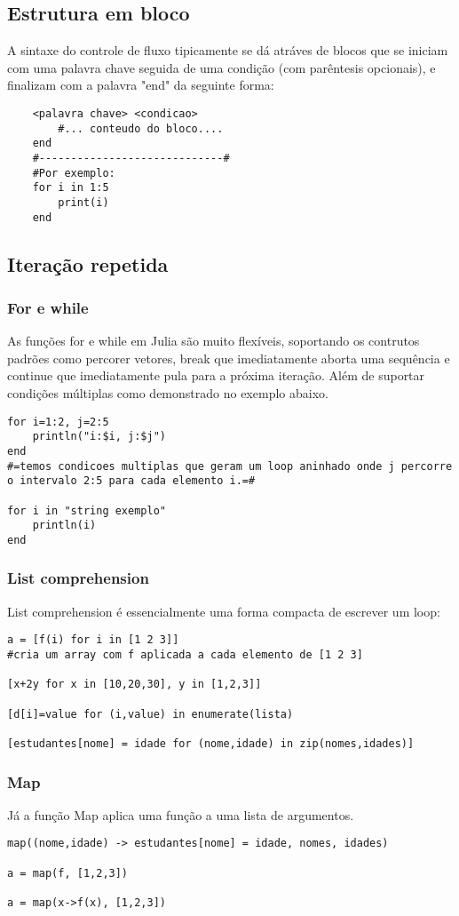 \subsection{Estrutura em bloco}
A sintaxe do controle de fluxo tipicamente se dá atráves de blocos que se iniciam com uma palavra chave seguida de uma condição (com parêntesis opcionais), e finalizam com a palavra "end" da seguinte forma: 
    \begin{lstlisting}
    <palavra chave> <condicao>
        #... conteudo do bloco....
    end 
    #-----------------------------#
    #Por exemplo:
    for i in 1:5
        print(i)
    end     
    \end{lstlisting}

\subsection{Iteração repetida}
\subsubsection{For e while}
As funções for e while em Julia são muito flexíveis, soportando os contrutos padrões como percorer vetores, break que imediatamente aborta uma sequência e continue que imediatamente pula para a próxima iteração. Além de suportar condições múltiplas como demonstrado no exemplo abaixo. 
\begin{lstlisting}
for i=1:2, j=2:5
	println("i:$i, j:$j")
end
#=temos condicoes multiplas que geram um loop aninhado onde j percorre o intervalo 2:5 para cada elemento i.=#

for i in "string exemplo"
	println(i)
end 
\end{lstlisting}
\subsubsection{List comprehension}
List comprehension é essencialmente uma forma compacta de escrever um loop:
\begin{lstlisting}
a = [f(i) for i in [1 2 3]] 
#cria um array com f aplicada a cada elemento de [1 2 3]

[x+2y for x in [10,20,30], y in [1,2,3]]

[d[i]=value for (i,value) in enumerate(lista)

[estudantes[nome] = idade for (nome,idade) in zip(nomes,idades)]
\end{lstlisting}
\subsubsection{Map}
Já a função Map aplica uma função a uma lista de argumentos.
\begin{lstlisting}
map((nome,idade) -> estudantes[nome] = idade, nomes, idades)

a = map(f, [1,2,3]) 

a = map(x->f(x), [1,2,3])
\end{lstlisting}

